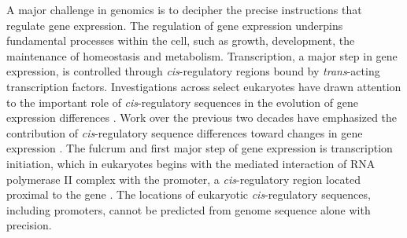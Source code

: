 \documentclass[nogrid]{MBE}%
\begin{document}
A major challenge in genomics is to decipher the precise instructions that regulate gene expression. The regulation of gene expression underpins fundamental processes within the cell, such as growth, development, the maintenance of homeostasis and metabolism. Transcription, a major step in gene expression, is controlled through \textit{cis}-regulatory regions bound by \textit{trans}-acting transcription factors. Investigations across select eukaryotes have drawn attention to the important role of \textit{cis}-regulatory sequences in the evolution of gene expression differences \citep{Wittkopp:2008ki, Wittkopp:2011bc, Siepel:2014hd}. Work over the previous two decades have emphasized the contribution of \textit{cis}-regulatory sequence differences toward changes in gene expression \citep{Wittkopp:2004cy}. The fulcrum and first major step of gene expression is transcription initiation, which in eukaryotes begins with the mediated interaction of RNA polymerase II complex with the promoter, a \textit{cis}-regulatory region located proximal to the gene \citep{Kadonaga:2011gz}. The locations of eukaryotic \textit{cis}-regulatory sequences, including promoters, cannot be predicted from genome sequence alone with precision.\\
\end{document}
